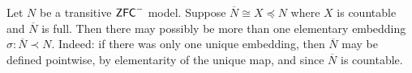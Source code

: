 \documentclass{amsart}
\newtheorem{lemma}[theorem]{Lemma}
\theoremstyle{definition}
\theoremstyle{remark}
\newtheorem*{claim}{Main Claim}
\newcommand{\N}{{\overline{N}}}
\newcommand{\ZFC}{\textup{\ensuremath{\textsf{ZFC}}}}
\DeclareMathOperator{\ran}{range}
\newcommand{\st}{\; | \;}
\newcommand{\set}[2]{\left\{#1\st #2 \right\}}
\newcommand{\SH}{\mathcal{H}\textit{ull} \,}
\newcommand{\Sk}[3]{\SH^{#1}( {#2} \cup {#3} ) }
\begin{document}
Let $N$ be a transitive $\ZFC^-$ model. Suppose $\N \cong X \preccurlyeq N$ where $X$ is countable and $\N$ is full. Then there may possibly be more than one elementary embedding $\sigma: \N \prec N$. 
Indeed: if there was only one unique embedding, then $\N$ may be defined pointwise, by elementarity of the unique map, and since $\N$ is countable.

%
%
\end{document}
